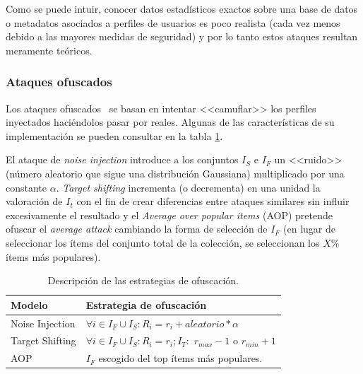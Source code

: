 Como se puede intuir, conocer datos estadísticos exactos sobre una base de datos o metadatos asociados a perfiles de usuarios es poco realista (cada vez menos debido a las mayores medidas de seguridad) y por lo tanto estos ataques resultan meramente teóricos.

\subsubsection{Ataques ofuscados}

Los ataques ofuscados~\cite{mingdan2018ShillingAttacksAReview} se basan en intentar <<camuflar>> los perfiles inyectados haciéndolos pasar por reales. Algunas de las características de su implementación se pueden consultar en la tabla \ref{tabla_descripcion_estrategias_ofuscación}.

El ataque de \textit{noise injection} introduce a los conjuntos $I_S$ e $I_F$ un <<ruido>> (número aleatorio que sigue una distribución Gaussiana) multiplicado por una constante $\alpha$. \textit{Target shifting} incrementa (o decrementa) en una unidad la valoración de $I_t$ con el fin de crear diferencias entre ataques similares sin influir excesivamente el resultado y el \textit{Average over popular items} (AOP) pretende ofuscar el \textit{average attack} cambiando la forma de selección de $I_F$ (en lugar de seleccionar los ítems del conjunto total de la colección, se seleccionan los $X\%$ ítems más populares).

\begin{table}
\small
\begin{centering}
	
		\begin{tabular}{@{}p{10em} p{20em}@{}}
		\toprule
		\textbf{Modelo} & \textbf{Estrategia de ofuscación}\\ 
		\midrule
			
		Noise Injection & $\forall i \in I_F \cup I_S: R_i = r_i + aleatorio * \alpha$\\
		Target Shifting & $\forall i \in I_F \cup I_S: R_i = r_i; I_T:$ $r_{max}-1$ o $r_{min}+1$\\
		AOP & $I_F$ escogido del top ítems más populares.\\
			
		\bottomrule
		\end{tabular}

\end{centering}
\caption[Sistemas de recomendación: estrategias de ofuscación]{Descripción de las estrategias de ofuscación.}	\label{tabla_descripcion_estrategias_ofuscación}
\end{table}

